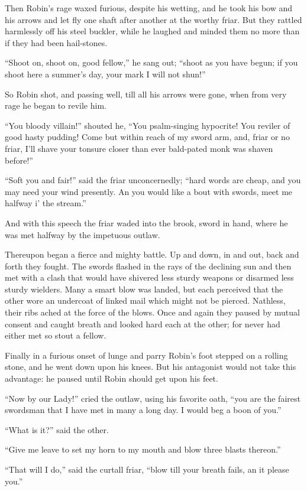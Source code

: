 Then Robin's rage waxed furious, despite his wetting, and he took his
bow and his arrows and let fly one shaft after another at the worthy
friar. But they rattled harmlessly off his steel buckler, while he
laughed and minded them no more than if they had been hail-stones.

``Shoot on, shoot on, good fellow,'' he sang out; ``shoot as you have
begun; if you shoot here a summer's day, your mark I will not shun!''

So Robin shot, and passing well, till all his arrows were gone, when
from very rage he began to revile him.

``You bloody villain!'' shouted he, ``You psalm-singing hypocrite! You
reviler of good hasty pudding! Come but within reach of my sword arm,
and, friar or no friar, I'll shave your tonsure closer than ever
bald-pated monk was shaven before!''

``Soft you and fair!'' said the friar unconcernedly; ``hard words are
cheap, and you may need your wind presently. An you would like a bout
with swords, meet me halfway i' the stream.''

And with this speech the friar waded into the brook, sword in hand,
where he was met halfway by the impetuous outlaw.

Thereupon began a fierce and mighty battle. Up and down, in and out,
back and forth they fought. The swords flashed in the rays of the
declining sun and then met with a clash that would have shivered less
sturdy weapons or disarmed less sturdy wielders. Many a smart blow was
landed, but each perceived that the other wore an undercoat of linked
mail which might not be pierced. Nathless, their ribs ached at the force
of the blows. Once and again they paused by mutual consent and caught
breath and looked hard each at the other; for never had either met so
stout a fellow.

Finally in a furious onset of lunge and parry Robin's foot stepped on a
rolling stone, and he went down upon his knees. But his antagonist would
not take this advantage: he paused until Robin should get upon his feet.

``Now by our Lady!'' cried the outlaw, using his favorite oath, ``you
are the fairest swordsman that I have met in many a long day. I would
beg a boon of you.''

``What is it?'' said the other.

``Give me leave to set my horn to my mouth and blow three blasts
thereon.''

``That will I do,'' said the curtall friar, ``blow till your breath
fails, an it please you.''

